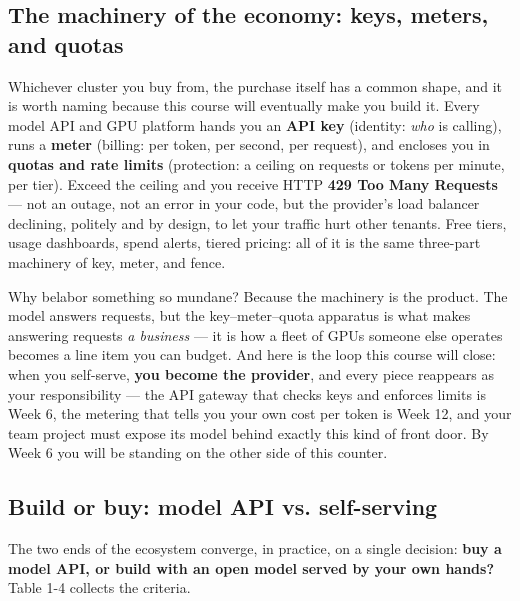 \subsection*{The machinery of the economy: keys, meters, and quotas}

Whichever cluster you buy from, the purchase itself has a common shape, and it is worth naming because this course will eventually make you build it. Every model API and GPU platform hands you an \textbf{API key} (identity: \textit{who} is calling), runs a \textbf{meter} (billing: per token, per second, per request), and encloses you in \textbf{quotas and rate limits} (protection: a ceiling on requests or tokens per minute, per tier). Exceed the ceiling and you receive HTTP \textbf{429 Too Many Requests} — not an outage, not an error in your code, but the provider's load balancer declining, politely and by design, to let your traffic hurt other tenants. Free tiers, usage dashboards, spend alerts, tiered pricing: all of it is the same three-part machinery of key, meter, and fence.

Why belabor something so mundane? Because the machinery is the product. The model answers requests, but the key–meter–quota apparatus is what makes answering requests \textit{a business} — it is how a fleet of GPUs someone else operates becomes a line item you can budget. And here is the loop this course will close: when you self-serve, \textbf{you become the provider}, and every piece reappears as your responsibility — the API gateway that checks keys and enforces limits is Week 6, the metering that tells you your own cost per token is Week 12, and your team project must expose its model behind exactly this kind of front door. By Week 6 you will be standing on the other side of this counter.

\subsection*{Build or buy: model API vs. self-serving}

The two ends of the ecosystem converge, in practice, on a single decision: \textbf{buy a model API, or build with an open model served by your own hands?} Table 1-4 collects the criteria.

